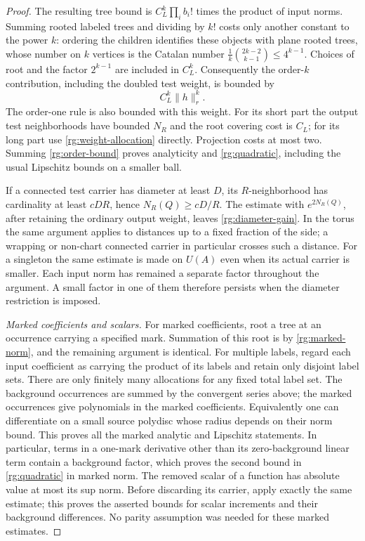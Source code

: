 \begin{proof}
The resulting tree bound is $C_L^k\prod_i b_i!$ times the product of
input norms.  Summing rooted labeled trees and dividing by $k!$ costs
only another constant to the power $k$: ordering the children identifies
these objects with plane rooted trees, whose number on $k$ vertices is
the Catalan number $\frac1k\binom{2k-2}{k-1}\le4^{k-1}$.
Choices of root and the factor $2^{k-1}$ are included in $C_L^k$.
Consequently the order-$k$ contribution, including the doubled test
weight, is bounded by
\begin{equation}
 C_L^k\|h\|_r^k.
 \label{rg:order-bound}
\end{equation}
The order-one rule is also bounded with this weight.  For its short part
the output test neighborhoods have bounded $N_R$ and the root covering
cost is $C_L$; for its long part use
\eqref{rg:weight-allocation} directly.  Projection costs at most two.
Summing \eqref{rg:order-bound} proves analyticity and
\eqref{rg:quadratic}, including the usual Lipschitz bounds on a smaller
ball.

If a connected test carrier has diameter at least $D$, its
$R$-neighborhood has cardinality at least $cDR$, hence
$N_R(Q)\ge cD/R$.  The estimate with $e^{2N_R(Q)}$, after retaining the
ordinary output weight, leaves \eqref{rg:diameter-gain}.  In the torus the
same argument applies to distances up to a fixed fraction of the side;
a wrapping or non-chart connected carrier in particular crosses such a
distance.  For a singleton the same estimate is made on $U(A)$ even when
its actual carrier is smaller.  Each input norm has remained a separate
factor throughout the argument.  A small factor in one of them therefore
persists when the diameter restriction is imposed.

\emph{Marked coefficients and scalars.}
For marked coefficients, root a tree at an occurrence carrying a
specified mark.  Summation of this root is by
\eqref{rg:marked-norm}, and the remaining argument is identical.
For multiple labels, regard each input coefficient as carrying the
product of its labels and retain only disjoint label sets.  There are
only finitely many allocations for any fixed total label set.  The
background occurrences are summed by the convergent series above;
the marked occurrences give polynomials in the marked coefficients.
Equivalently one can differentiate on a small source polydisc whose
radius depends on their norm bound.  This proves all the marked analytic
and Lipschitz statements.  In particular, terms in a one-mark derivative
other than its zero-background linear term contain a background factor,
which proves the second bound in \eqref{rg:quadratic} in marked norm.
The removed scalar of a function has absolute value at most its sup
norm.  Before discarding its carrier, apply exactly the same estimate;
this proves the asserted bounds for scalar increments and their
background differences.  No parity assumption was needed for these
marked estimates.


\end{proof}
